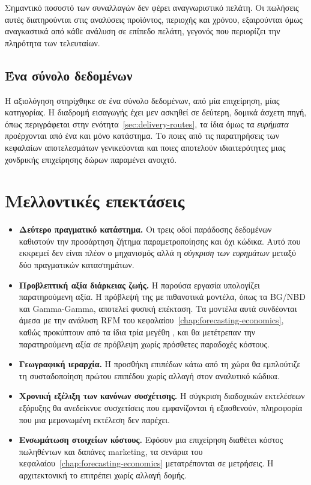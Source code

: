 Σημαντικό ποσοστό των συναλλαγών δεν φέρει αναγνωριστικό πελάτη. Οι πωλήσεις
αυτές διατηρούνται στις αναλύσεις προϊόντος, περιοχής και χρόνου, εξαιρούνται
όμως αναγκαστικά από κάθε ανάλυση σε επίπεδο πελάτη, γεγονός που περιορίζει την
πληρότητα των τελευταίων.

\subsection{Ένα σύνολο δεδομένων}

Η αξιολόγηση στηρίχθηκε σε ένα σύνολο δεδομένων, από μία επιχείρηση, μίας
κατηγορίας. Η διαδρομή εισαγωγής έχει μεν ασκηθεί σε δεύτερη, δομικά άσχετη
πηγή, όπως περιγράφεται στην ενότητα~\ref{sec:delivery-routes}, τα ίδια όμως
τα \emph{ευρήματα} προέρχονται από ένα και μόνο κατάστημα. Το ποιες από τις
παρατηρήσεις των κεφαλαίων αποτελεσμάτων γενικεύονται και ποιες αποτελούν
ιδιαιτερότητες μιας χονδρικής επιχείρησης δώρων παραμένει ανοιχτό.

\section{Μελλοντικές επεκτάσεις}

\begin{itemize}
  \item \textbf{Δεύτερο πραγματικό κατάστημα.} Οι τρεις οδοί παράδοσης
        δεδομένων καθιστούν την προσάρτηση ζήτημα παραμετροποίησης και όχι
        κώδικα. Αυτό που εκκρεμεί δεν είναι πλέον ο μηχανισμός αλλά η
        \emph{σύγκριση των ευρημάτων} μεταξύ δύο πραγματικών καταστημάτων.
  \item \textbf{Προβλεπτική αξία διάρκειας ζωής.} Η παρούσα εργασία υπολογίζει
        παρατηρούμενη αξία. Η πρόβλεψή της με πιθανοτικά μοντέλα, όπως τα
        \textenglish{BG/NBD} \cite{fader2005counting} και
        \textenglish{Gamma-Gamma}, αποτελεί φυσική επέκταση. Τα μοντέλα αυτά
        συνδέονται άμεσα με την ανάλυση \textenglish{RFM} του
        κεφαλαίου~\ref{chap:forecasting-economics}, καθώς προκύπτουν από τα
        ίδια τρία μεγέθη \cite{fader2005rfm}, και θα μετέτρεπαν την
        παρατηρούμενη αξία σε πρόβλεψη χωρίς πρόσθετες παραδοχές κόστους.
  \item \textbf{Γεωγραφική ιεραρχία.} Η προσθήκη επιπέδων κάτω από τη χώρα θα
        εμπλούτιζε τη συσταδοποίηση πρώτου επιπέδου χωρίς αλλαγή στον
        αναλυτικό κώδικα.
  \item \textbf{Χρονική εξέλιξη των κανόνων συσχέτισης.} Η σύγκριση διαδοχικών
        εκτελέσεων εξόρυξης θα ανεδείκνυε συσχετίσεις που εμφανίζονται ή
        εξασθενούν, πληροφορία που μια μεμονωμένη εκτέλεση δεν παρέχει.
  \item \textbf{Ενσωμάτωση στοιχείων κόστους.} Εφόσον μια επιχείρηση διαθέτει
        κόστος πωληθέντων και δαπάνες marketing, τα σενάρια του
        κεφαλαίου~\ref{chap:forecasting-economics} μετατρέπονται σε μετρήσεις.
        Η αρχιτεκτονική το επιτρέπει χωρίς αλλαγή δομής.
\end{itemize}

